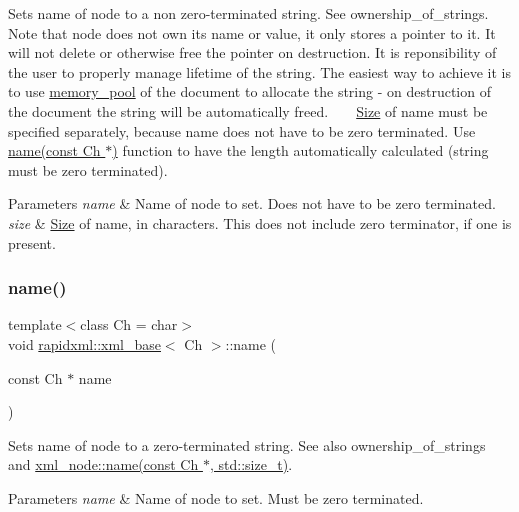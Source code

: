 Sets name of node to a non zero-\/terminated string. See ownership\+\_\+of\+\_\+strings. ~\newline
~\newline
 Note that node does not own its name or value, it only stores a pointer to it. It will not delete or otherwise free the pointer on destruction. It is reponsibility of the user to properly manage lifetime of the string. The easiest way to achieve it is to use \hyperlink{classrapidxml_1_1memory__pool}{memory\+\_\+pool} of the document to allocate the string -\/ on destruction of the document the string will be automatically freed. ~\newline
~\newline
 \hyperlink{classSize}{Size} of name must be specified separately, because name does not have to be zero terminated. Use \hyperlink{classrapidxml_1_1xml__base_a4611ddc82ac83a527c65606600eb2a0d}{name(const Ch $\ast$)} function to have the length automatically calculated (string must be zero terminated). 
\begin{DoxyParams}{Parameters}
{\em name} & Name of node to set. Does not have to be zero terminated. \\
\hline
{\em size} & \hyperlink{classSize}{Size} of name, in characters. This does not include zero terminator, if one is present. \\
\hline
\end{DoxyParams}
\mbox{\label{classrapidxml_1_1xml__base_a4611ddc82ac83a527c65606600eb2a0d}} 
\subsubsection{\texorpdfstring{name()}{name()}\hspace{0.1cm}{\footnotesize\ttfamily [3/3]}}
{\footnotesize\ttfamily template$<$class Ch  = char$>$ \\
void \hyperlink{classrapidxml_1_1xml__base}{rapidxml\+::xml\+\_\+base}$<$ Ch $>$\+::name (\begin{DoxyParamCaption}\item[{const Ch $\ast$}]{name }\end{DoxyParamCaption})\hspace{0.3cm}{\ttfamily [inline]}}

Sets name of node to a zero-\/terminated string. See also ownership\+\_\+of\+\_\+strings and \hyperlink{classrapidxml_1_1xml__base_ae55060ae958c6e6465d6c8db852ec6ce}{xml\+\_\+node\+::name(const Ch $\ast$, std\+::size\+\_\+t)}. 
\begin{DoxyParams}{Parameters}
{\em name} & Name of node to set. Must be zero terminated. \\
\hline
\end{DoxyParams}
\mbox{\label{classrapidxml_1_1xml__base_a20c8ffbe0c7a0b4231681ab8b99330a4}} 
